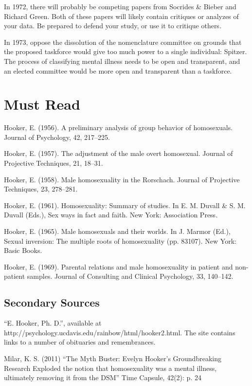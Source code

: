 In 1972, there will probably be competing papers from Socrides \& Bieber and Richard Green. Both of these papers will likely contain critiques or analyzes of your data. Be prepared to defend your study, or use it to critique others.

In 1973, oppose the dissolution of the nomenclature committee on grounds that the proposed taskforce would give too much power to a single individual: Spitzer. The process of classifying mental illness needs to be open and transparent, and an elected committee would be more open and transparent than a taskforce.

\section{Must Read}
\label{mustread}

Hooker, E. (1956). A preliminary analysis of group behavior of homosexuals. Journal of Psychology, 42, 217--225.

Hooker, E. (1957). The adjustment of the male overt homosexual. Journal of Projective Techniques, 21, 18--31.

Hooker, E. (1958). Male homosexuality in the Rorschach. Journal of Projective Techniques, 23, 278--281.

Hooker, E. (1961). Homosexuality: Summary of studies. In E. M. Duvall \& S. M. Duvall (Eds.), Sex ways in fact and faith. New York: Association Press.

Hooker, E. (1965). Male homosexuals and their worlds. In J. Marmor (Ed.), Sexual inversion: The multiple roots of homosexuality (pp. 83107). New York: Basic Books.

Hooker, E. (1969). Parental relations and male homosexuality in patient and non-patient samples. Journal of Consulting and Clinical Psychology, 33, 140--142.

\subsection{Secondary Sources}
\label{secondarysources}

``E. Hooker, Ph. D.'', available at http:\slash \slash psychology.ucdavis.edu\slash rainbow\slash html\slash hooker2.html. The site contains links to a number of obituaries and remembrances.

Milar, K. S. (2011) ``The Myth Buster: Evelyn Hooker's Groundbreaking Research Exploded the notion that homosexuality was a mental illness, ultimately removing it from the DSM'' Time Capsule, 42(2): p. 24




